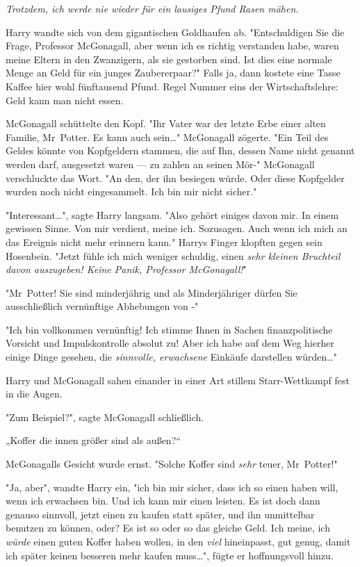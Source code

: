 {\emph{Trotzdem, ich werde nie wieder für ein lausiges Pfund Rasen mähen.}

Harry wandte sich von dem gigantischen Goldhaufen ab. "Entschuldigen Sie die Frage, Professor McGonagall, aber wenn ich es richtig verstanden habe, waren meine Eltern in den Zwanzigern, als sie gestorben sind. Ist dies eine normale Menge an Geld für ein junges Zaubererpaar?" Falls ja, dann kostete eine Tasse Kaffee hier wohl fünftausend Pfund. Regel Nummer eins der Wirtschaftslehre: Geld kann man nicht essen.

McGonagall schüttelte den Kopf. "Ihr Vater war der letzte Erbe einer alten Familie, Mr~Potter. Es kann auch sein…" McGonagall zögerte. "Ein Teil des Geldes könnte von Kopfgeldern stammen, die auf Ihn, dessen Name nicht genannt werden darf, ausgesetzt waren --- zu zahlen an seinen Mör-" McGonagall verschluckte das Wort. "An den, der ihn besiegen würde. Oder diese Kopfgelder wurden noch nicht eingesammelt. Ich bin mir nicht sicher."

"Interessant…", sagte Harry langsam. "Also gehört einiges davon mir. In einem gewissen Sinne. Von mir verdient, meine ich. Sozusagen. Auch wenn ich mich an das Ereignis nicht mehr erinnern kann." Harrys Finger klopften gegen sein Hosenbein. "Jetzt fühle ich mich weniger schuldig, einen \emph{sehr kleinen Bruchteil davon auszugeben! Keine Panik, Professor McGonagall!}"

"Mr~Potter! Sie sind minderjährig und als Minderjähriger dürfen Sie ausschließlich vernünftige Abhebungen von -"

"Ich bin vollkommen vernünftig! Ich stimme Ihnen in Sachen finanzpolitische Vorsicht und Impulskontrolle absolut zu! Aber ich habe auf dem Weg hierher einige Dinge gesehen, die \emph{sinnvolle, erwachsene} Einkäufe darstellen würden…"

Harry und McGonagall sahen einander in einer Art stillem Starr-Wettkampf fest in die Augen.

"Zum Beispiel?", sagte McGonagall schließlich.

„Koffer die innen größer sind als außen?“

McGonagalls Gesicht wurde ernst. "Solche Koffer sind \emph{sehr} teuer, Mr~Potter!"

"Ja, aber", wandte Harry ein, "ich bin mir sicher, dass ich so einen haben will, wenn ich erwachsen bin. Und ich kann mir einen leisten. Es ist doch dann genauso sinnvoll, jetzt einen zu kaufen statt später, und ihn unmittelbar benutzen zu können, oder? Es ist so oder so das gleiche Geld. Ich meine, ich \emph{würde} einen guten Koffer haben wollen, in den \emph{viel} hineinpasst, gut genug, damit ich später keinen besseren mehr kaufen muss…", fügte er hoffnungsvoll hinzu.

}
